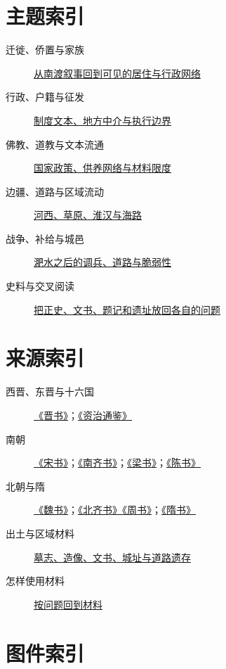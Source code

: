 \section{主题索引}
\begin{description}
  \item[迁徙、侨置与家族] \hyperref[sec:synthesis-migration]{从南渡叙事回到可见的居住与行政网络}
  \item[行政、户籍与征发] \hyperref[sec:synthesis-administration]{制度文本、地方中介与执行边界}
  \item[佛教、道教与文本流通] \hyperref[sec:synthesis-religion]{国家政策、供养网络与材料限度}
  \item[边疆、道路与区域流动] \hyperref[sec:synthesis-frontier]{河西、草原、淮汉与海路}
  \item[战争、补给与城邑] \hyperref[sec:eastern-jin-fei-river-liu-yu]{淝水之后的调兵、道路与脆弱性}
  \item[史料与交叉阅读] \hyperref[sec:synthesis-cross-reading]{把正史、文书、题记和遗址放回各自的问题}
\end{description}

\section{来源索引}
\begin{description}
  \item[西晋、东晋与十六国] \hyperref[src:jinshu]{《晋书》}；\hyperref[src:zizhi-tongjian]{《资治通鉴》}
  \item[南朝] \hyperref[src:songshu]{《宋书》}；\hyperref[src:nanqishu]{《南齐书》}；\hyperref[src:liangshu]{《梁书》}；\hyperref[src:chenshu]{《陈书》}
  \item[北朝与隋] \hyperref[src:weishu]{《魏书》}；\hyperref[src:beiqishu-zhoushu]{《北齐书》《周书》}；\hyperref[src:suishu]{《隋书》}
  \item[出土与区域材料] \hyperref[src:material-record]{墓志、造像、文书、城址与道路遗存}
  \item[怎样使用材料] \hyperref[src:question-method]{按问题回到材料}
\end{description}

\section{图件索引}
\begin{description}
\end{description}
